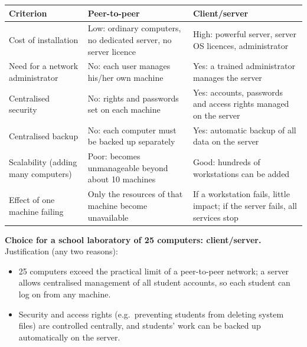 \documentclass[11pt]{article}
\begin{document}
\begin{corrige}
\begin{center}
\begin{tabularx}{\linewidth}{|l|X|X|}
\hline
\rowcolor{popblueL} \textbf{Criterion} & \textbf{Peer-to-peer} & \textbf{Client/server} \\
\hline
Cost of installation & Low: ordinary computers, no dedicated server, no server licence & High: powerful server, server OS licences, administrator \\
\hline
Need for a network administrator & No: each user manages his/her own machine & Yes: a trained administrator manages the server \\
\hline
Centralised security & No: rights and passwords set on each machine & Yes: accounts, passwords and access rights managed on the server \\
\hline
Centralised backup & No: each computer must be backed up separately & Yes: automatic backup of all data on the server \\
\hline
Scalability (adding many computers) & Poor: becomes unmanageable beyond about 10 machines & Good: hundreds of workstations can be added \\
\hline
Effect of one machine failing & Only the resources of that machine become unavailable & If a workstation fails, little impact; if the server fails, all services stop \\
\hline
\end{tabularx}
\end{center}
\textbf{Choice for a school laboratory of 25 computers: client/server.} Justification (any two reasons):
\begin{itemize}
\item 25 computers exceed the practical limit of a peer-to-peer network; a server allows centralised management of all student accounts, so each student can log on from any machine.
\item Security and access rights (e.g.\ preventing students from deleting system files) are controlled centrally, and students' work can be backed up automatically on the server.
\end{itemize}
\end{corrige}
\end{document}
